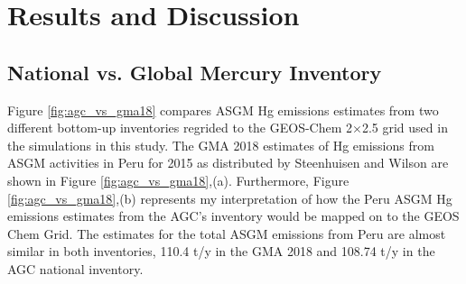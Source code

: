 


\section{Results and Discussion}\label{c3_results}
\subsection{National vs. Global Mercury Inventory}
Figure \ref{fig:agc_vs_gma18} compares ASGM Hg emissions estimates from two different bottom-up inventories regrided to the GEOS-Chem 2$\times$2.5 grid used in the simulations in this study. The GMA 2018  estimates of Hg emissions from ASGM activities in Peru for 2015 as distributed by Steenhuisen and Wilson\cite{steenhuisen_development_2019} are shown in Figure \ref{fig:agc_vs_gma18},(a). Furthermore, Figure \ref{fig:agc_vs_gma18},(b) represents my interpretation of how the Peru ASGM Hg emissions estimates from the AGC's inventory\cite{agc_reporte_2017} would be mapped on to the GEOS Chem Grid. The estimates for the total ASGM emissions from Peru are almost similar in both inventories, 110.4 t/y in the GMA 2018 and 108.74 t/y in the AGC national inventory.





